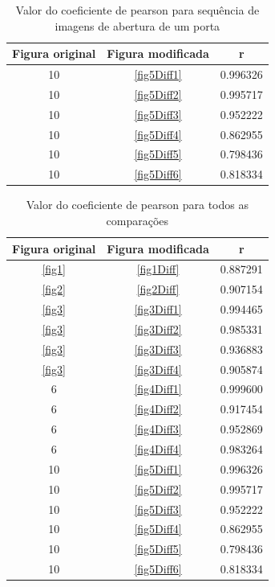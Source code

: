 \documentclass[10pt,a4paper]{article}
\begin{document}
\begin{table}[h!]
  \begin{center}
    \caption{Valor do coeficiente de pearson para sequência de imagens
      de abertura de um porta}
    \begin{tabular}{|c|c|c|}
      \hline
      Figura original & Figura modificada & r\\
      \hline
      10 &  \ref{fig5Diff1} & 0.996326\\
      10 &  \ref{fig5Diff2} & 0.995717\\
      10 &  \ref{fig5Diff3} & 0.952222\\
      10 &  \ref{fig5Diff4} & 0.862955\\
      10 &  \ref{fig5Diff5} & 0.798436\\
      10 &  \ref{fig5Diff6} & 0.818334\\
      \hline
    \end{tabular}
  \end{center}
\end{table}


\newpage
\begin{table}[h!]
  \begin{center}
    \caption{Valor do coeficiente de pearson para todos as comparações}
    \begin{tabular}{|c|c|c|}
      \hline
      Figura original & Figura modificada & r\\
      \hline
      \ref{fig1} &  \ref{fig1Diff} &  0.887291 \\
      \ref{fig2} &  \ref{fig2Diff} &  0.907154\\
      \ref{fig3} &  \ref{fig3Diff1} & 0.994465\\
      \ref{fig3} & \ref{fig3Diff2} &  0.985331\\
      \ref{fig3} &  \ref{fig3Diff3} &  0.936883\\
      \ref{fig3} &  \ref{fig3Diff4} &  0.905874\\
      6 &  \ref{fig4Diff1} & 0.999600\\
      6 &  \ref{fig4Diff2} &  0.917454\\
      6 &  \ref{fig4Diff3} &   0.952869\\
      6 &  \ref{fig4Diff4} &   0.983264\\
      10 &  \ref{fig5Diff1} & 0.996326\\
      10 &  \ref{fig5Diff2} & 0.995717\\
      10 &  \ref{fig5Diff3} & 0.952222\\
      10 &  \ref{fig5Diff4} & 0.862955\\
      10 &  \ref{fig5Diff5} & 0.798436\\
      10 &  \ref{fig5Diff6} & 0.818334\\
      \hline
    \end{tabular}
  \end{center}
\end{table}
\end{document}
